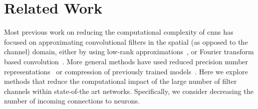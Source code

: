 \documentclass[thesis]{subfiles}
\begin{document}
	\section{Related Work}\label{previouswork}
	Most previous work on reducing the computational complexity of \glspl{cnn} has focused on approximating convolutional filters in the spatial (as opposed to the channel) domain, either by using low-rank approximations~\citep{mamalet2012simplifying,journals/corr/JaderbergVZ14, conf/cvpr/RigamontiSLF13, journals/corr/LebedevGROL14}, or Fourier transform based convolution~\citep{mathieu2013fast, rippel2015spectral}. More general methods have used reduced precision number representations~\citep{1502.02551v1} or compression of previously trained models~\citep{Chen2015,Kim2016}. Here we explore methods that reduce the computational impact of the large number of filter channels within state-of-the art networks. Specifically, we consider decreasing the number of incoming connections to neurons.
	
\end{document}
